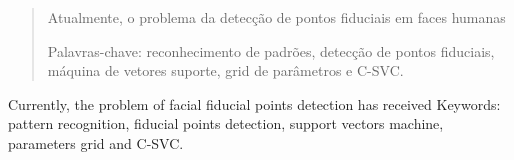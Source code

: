\begin{abstract}

Atualmente, o problema da detecção de pontos fiduciais em faces humanas

\noindent \textsf{Palavras-chave:} reconhecimento de padrões, detecção de pontos fiduciais, máquina de vetores suporte, grid de parâmetros e C-SVC.

\end{abstract}




\begin{foreignabstract}

Currently, the problem of facial fiducial points detection has received
\noindent \textsf{Keywords:} pattern recognition, fiducial points detection, support vectors machine, parameters grid and C-SVC.

\end{foreignabstract}



   \pagestyle{plain}
   \lhead[\fancyplain{}{\bfseries\tiny\thepage}]{\fancyplain{}{\bfseries\tiny\rightmark}}
   \rhead[\fancyplain{}{\bfseries\tiny\leftmark}]{}

  \tableofcontents
  \listoffigures
  \listoftables

\cleardoublepage
